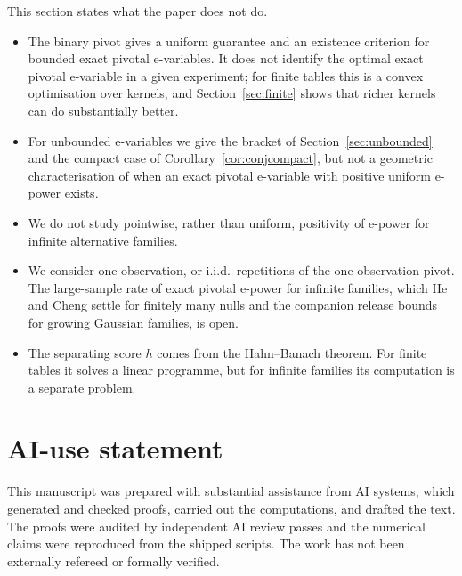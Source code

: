 \documentclass[11pt,a4paper]{article}
\theoremstyle{definition}
\theoremstyle{remark}
\begin{document}
This section states what the paper does not do.
\begin{itemize}[leftmargin=*]
\item The binary pivot gives a uniform guarantee and an existence criterion for bounded exact pivotal e-variables. It does not identify the optimal exact pivotal e-variable in a given experiment; for finite tables this is a convex optimisation over kernels, and Section~\ref{sec:finite} shows that richer kernels can do substantially better.
\item For unbounded e-variables we give the bracket of Section~\ref{sec:unbounded} and the compact case of Corollary~\ref{cor:conjcompact}, but not a geometric characterisation of when an exact pivotal e-variable with positive uniform e-power exists.
\item We do not study pointwise, rather than uniform, positivity of e-power for infinite alternative families.
\item We consider one observation, or i.i.d.\ repetitions of the one-observation pivot. The large-sample rate of exact pivotal e-power for infinite families, which He and Cheng \cite{HeCheng} settle for finitely many nulls and the companion release \cite{companion} bounds for growing Gaussian families, is open.
\item The separating score \(h\) comes from the Hahn--Banach theorem. For finite tables it solves a linear programme, but for infinite families its computation is a separate problem.
\end{itemize}

\section*{AI-use statement}
This manuscript was prepared with substantial assistance from AI systems, which generated and checked proofs, carried out the computations, and drafted the text. The proofs were audited by independent AI review passes and the numerical claims were reproduced from the shipped scripts. The work has not been externally refereed or formally verified.
\end{document}
